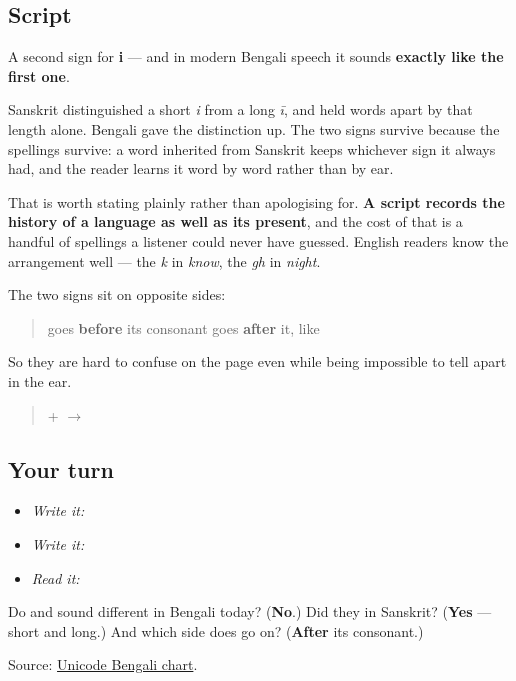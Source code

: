 \subsection*{Script}
\begin{quote}
\end{quote}

A second sign for \textbf{i} — and in modern Bengali speech it sounds \textbf{exactly like the first one}.

Sanskrit distinguished a short \emph{i} from a long \emph{ī}, and held words apart by that length alone. Bengali gave the distinction up. The two signs survive because the spellings survive: a word inherited from Sanskrit keeps whichever sign it always had, and the reader learns it word by word rather than by ear.

That is worth stating plainly rather than apologising for. \textbf{A script records the history of a language as well as its present}, and the cost of that is a handful of spellings a listener could never have guessed. English readers know the arrangement well — the \emph{k} in \emph{know}, the \emph{gh} in \emph{night}.

The two signs sit on opposite sides:

\begin{quote}
\textbf{} goes \textbf{before} its consonant \textbf{} goes \textbf{after} it, like \textbf{}
\end{quote}

So they are hard to confuse on the page even while being impossible to tell apart in the ear.

\begin{quote}
\textbf{} + \textbf{} $\to$ \textbf{}
\end{quote}

\subsection*{Your turn}
\begin{itemize}
\raggedright
  \item \emph{Write it:} 
  \item \emph{Write it:} 
  \item \emph{Read it:} 
\end{itemize}

\begin{tcolorbox}[breakable,colback=teal!4,colframe=teal!35!black,title={Before you move on}]
Do \textbf{} and \textbf{} sound different in Bengali today? (\textbf{No}.) Did they in Sanskrit? (\textbf{Yes} — short and long.) And which side does \textbf{} go on? (\textbf{After} its consonant.)

Source: \href{https://www.unicode.org/charts/PDF/U0980.pdf}{Unicode Bengali chart}.
\end{tcolorbox}
